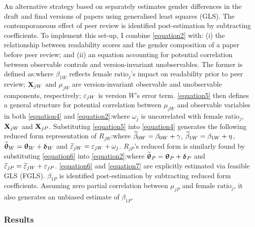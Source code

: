 An alternative strategy based on \citet{Ashenfelter1994} separately estimates gender differences in the draft and final versions of papers using generalised least squares (GLS). The contemporaneous effect of peer review is identified post-estimation by subtracting coefficients. To implement this set-up, I combine \autoref{equation2} with: (i) the relationship between readability scores and the gender composition of a paper before peer review; and (ii) an equation accounting for potential correlation between observable controls and version-invariant unobservables. The former is defined as:where $\beta_{1W}$ reflects $\text{female ratio}_j$'s impact on readability prior to peer review; $\mathbf{X}_{jW}$ and $\mu_{jW}$ are version-invariant observable and unobservable components, respectively; $\varepsilon_{jW}$ is version $W$'s error term. \autoref{equation5} then defines a general structure for potential correlation between $\mu_{jW}$ and observable variables in both \autoref{equation4} and \autoref{equation2}:where $\omega_j$ is uncorrelated with $\text{female ratio}_j$, $\mathbf{X}_{jW}$ and $\mathbf{X}_{jP}$. Substituting \autoref{equation5} into \autoref{equation4} generates the following reduced form representation of $R_{jW}$:where $\widetilde\beta_{0W}=\beta_{0W}+\gamma$, $\widetilde\beta_{1W}=\beta_{1W}+\eta$, $\widetilde{\bm\uptheta}_W=\bm\uptheta_W+\bm\updelta_W$ and $\widetilde{\varepsilon}_{jW}=\varepsilon_{jW}+\omega_j$. $R_{jP}$'s reduced form is similarly found by substituting \autoref{equation6} into \autoref{equation2}:where $\widetilde{\bm\uptheta}_P=\bm\uptheta_P+\bm\updelta_P$ and $\widetilde{\varepsilon}_{jP}=\widetilde{\varepsilon}_{jW}+\varepsilon_{jP}$. \autoref{equation6} and \autoref{equation7} are explicitly estimated via feasible GLS (FGLS). $\beta_{1P}$ is identified post-estimation by subtracting reduced form coefficients. Assuming zero partial correlation between $\mu_{jP}$ and $\text{female ratio}_j$, it also generates an unbiased estimate of $\beta_{1P}$.

\subsubsection{Results}
\label{nberresults}



